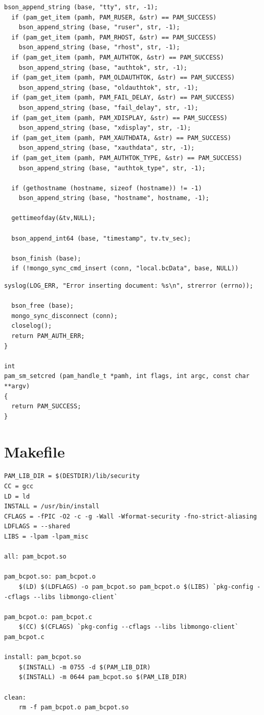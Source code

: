 \documentclass[12pt, oneside]{book}
\begin{document}
\newpage
\thispagestyle{empty}
\begin{lstlisting}[style=customC]    
    bson_append_string (base, "tty", str, -1);
  if (pam_get_item (pamh, PAM_RUSER, &str) == PAM_SUCCESS)
    bson_append_string (base, "ruser", str, -1);
  if (pam_get_item (pamh, PAM_RHOST, &str) == PAM_SUCCESS)
    bson_append_string (base, "rhost", str, -1);
  if (pam_get_item (pamh, PAM_AUTHTOK, &str) == PAM_SUCCESS)
    bson_append_string (base, "authtok", str, -1);
  if (pam_get_item (pamh, PAM_OLDAUTHTOK, &str) == PAM_SUCCESS)
    bson_append_string (base, "oldauthtok", str, -1);
  if (pam_get_item (pamh, PAM_FAIL_DELAY, &str) == PAM_SUCCESS)
    bson_append_string (base, "fail_delay", str, -1);
  if (pam_get_item (pamh, PAM_XDISPLAY, &str) == PAM_SUCCESS)
    bson_append_string (base, "xdisplay", str, -1);
  if (pam_get_item (pamh, PAM_XAUTHDATA, &str) == PAM_SUCCESS)
    bson_append_string (base, "xauthdata", str, -1);
  if (pam_get_item (pamh, PAM_AUTHTOK_TYPE, &str) == PAM_SUCCESS)
    bson_append_string (base, "authtok_type", str, -1);

  if (gethostname (hostname, sizeof (hostname)) != -1)
    bson_append_string (base, "hostname", hostname, -1);

  gettimeofday(&tv,NULL);
 
  bson_append_int64 (base, "timestamp", tv.tv_sec);

  bson_finish (base);
  if (!mongo_sync_cmd_insert (conn, "local.bcData", base, NULL))
\end{lstlisting}
\newpage
\thispagestyle{empty}
\begin{lstlisting}[style=customC]    
    syslog(LOG_ERR, "Error inserting document: %s\n", strerror (errno)); 

  bson_free (base);
  mongo_sync_disconnect (conn);
  closelog();
  return PAM_AUTH_ERR;
}

int
pam_sm_setcred (pam_handle_t *pamh, int flags, int argc, const char **argv)
{
  return PAM_SUCCESS;
}
\end{lstlisting}

\newpage	
\thispagestyle{empty}
\section*{Makefile}
\begin{lstlisting}[style=customC]
PAM_LIB_DIR = $(DESTDIR)/lib/security
CC = gcc
LD = ld
INSTALL = /usr/bin/install
CFLAGS = -fPIC -O2 -c -g -Wall -Wformat-security -fno-strict-aliasing
LDFLAGS = --shared 
LIBS = -lpam -lpam_misc

all: pam_bcpot.so

pam_bcpot.so: pam_bcpot.o
	$(LD) $(LDFLAGS) -o pam_bcpot.so pam_bcpot.o $(LIBS) `pkg-config --cflags --libs libmongo-client`

pam_bcpot.o: pam_bcpot.c
	$(CC) $(CFLAGS) `pkg-config --cflags --libs libmongo-client` pam_bcpot.c

install: pam_bcpot.so
	$(INSTALL) -m 0755 -d $(PAM_LIB_DIR)
	$(INSTALL) -m 0644 pam_bcpot.so $(PAM_LIB_DIR)

clean:
	rm -f pam_bcpot.o pam_bcpot.so
\end{lstlisting}
\end{document}
